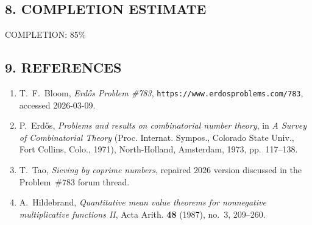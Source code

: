 \subsection*{8. COMPLETION ESTIMATE}

COMPLETION: 85\%

\subsection*{9. REFERENCES}

\begin{enumerate}
	\item[\textbf{[EP783]}] T.~F.~Bloom, \emph{Erd\H{o}s Problem \#783}, \texttt{https://www.erdosproblems.com/783}, accessed 2026-03-09.
	\item[\textbf{[Er73]}] P.~Erd\H{o}s, \emph{Problems and results on combinatorial number theory}, in \emph{A Survey of Combinatorial Theory} (Proc. Internat. Sympos., Colorado State Univ., Fort Collins, Colo., 1971), North-Holland, Amsterdam, 1973, pp.~117--138.
	\item[\textbf{[Tao26]}] T.~Tao, \emph{Sieving by coprime numbers}, repaired 2026 version discussed in the Problem~\#783 forum thread.
	\item[\textbf{[Hi87]}] A.~Hildebrand, \emph{Quantitative mean value theorems for nonnegative multiplicative functions II}, Acta Arith. \textbf{48} (1987), no.~3, 209--260.
\end{enumerate}